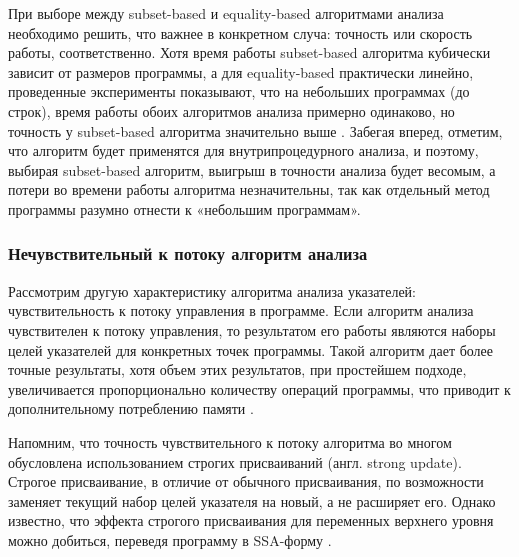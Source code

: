 \documentclass[14pt,titlepage]{extarticle}
\newcommand{\num}[1]{\numprint{#1}}
\newcommand{\eng}[1]{{\English#1}}
\begin{document}
        При выборе между \eng{subset-based} и \eng{equality-based} алгоритмами
        анализа необходимо решить, что важнее в конкретном случа:
        точность или скорость работы, соответственно.
        Хотя время работы \eng{subset-based} алгоритма кубически зависит от
        размеров программы, а для \eng{equality-based} практически линейно,
        проведенные эксперименты показывают, что на небольших программах (до
        \num{3000} строк), время работы обоих алгоритмов анализа примерно
        одинаково, но точность у \eng{subset-based} алгоритма значительно выше
        \cite{shapiro_fast_and_accurate}.
        Забегая вперед, отметим, что алгоритм будет применятся для
        внутрипроцедурного анализа, и поэтому, выбирая \eng{subset-based}
        алгоритм, выигрыш в точности анализа будет весомым, а потери во времени
        работы алгоритма незначительны, так как отдельный метод программы
        разумно отнести к «небольшим программам».

      \subsubsection{Нечувствительный к потоку алгоритм анализа}
        \label{section:flow_sensetive_analysis}

        Рассмотрим другую характеристику алгоритма анализа указателей:
        чувствительность к потоку управления в программе.
        Если алгоритм анализа чувствителен к потоку управления, то результатом
        его работы являются наборы целей указателей для конкретных точек
        программы.
        Такой алгоритм дает более точные результаты, хотя объем этих
        результатов, при простейшем подходе, увеличивается пропорционально
        количеству операций программы, что приводит к дополнительному
        потреблению памяти \cite[с.~57]{hind_pointer_analysis_not_solved_yet}.

        Напомним, что точность чувствительного к потоку алгоритма во многом
        обусловлена использованием строгих присваиваний (англ. \eng{strong
        update}).
        Строгое присваивание, в отличие от обычного присваивания, по возможности
        заменяет текущий набор целей указателя на новый, а не расширяет его.
        Однако известно, что эффекта строгого присваивания для переменных
        верхнего уровня можно добиться, переведя программу в SSA-форму
        \cite{points_to_with_efficient_strong_updates}.
\end{document}
